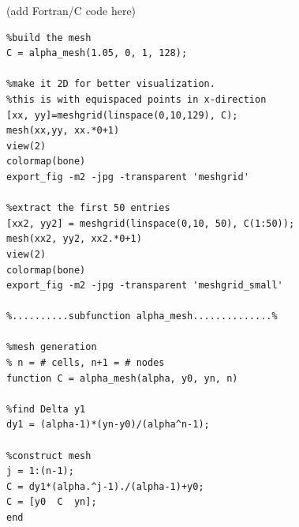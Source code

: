 \documentclass{article}
\begin{document}
(add Fortran/C code here)

\begin{verbatim}
%build the mesh
C = alpha_mesh(1.05, 0, 1, 128);

%make it 2D for better visualization. 
%this is with equispaced points in x-direction
[xx, yy]=meshgrid(linspace(0,10,129), C);
mesh(xx,yy, xx.*0+1)
view(2)
colormap(bone)
export_fig -m2 -jpg -transparent 'meshgrid'

%extract the first 50 entries
[xx2, yy2] = meshgrid(linspace(0,10, 50), C(1:50)); 
mesh(xx2, yy2, xx2.*0+1)
view(2)
colormap(bone)
export_fig -m2 -jpg -transparent 'meshgrid_small'

%..........subfunction alpha_mesh..............%

%mesh generation
% n = # cells, n+1 = # nodes
function C = alpha_mesh(alpha, y0, yn, n)
    
%find Delta y1
dy1 = (alpha-1)*(yn-y0)/(alpha^n-1);

%construct mesh
j = 1:(n-1);
C = dy1*(alpha.^j-1)./(alpha-1)+y0; 
C = [y0  C  yn];
end
\end{verbatim}
\end{document}
